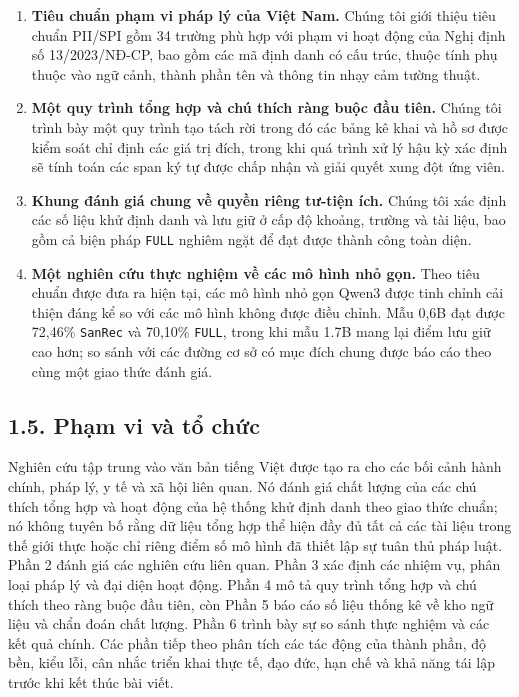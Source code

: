 \documentclass[
  11pt,
  a4paper,
]{article}
\providecommand{\tightlist}{%
  \setlength{\itemsep}{0pt}\setlength{\parskip}{0pt}}
\begin{document}
\begin{enumerate}
\def\labelenumi{\arabic{enumi}.}
\tightlist
\item
  \textbf{Tiêu chuẩn phạm vi pháp lý của Việt Nam.} Chúng tôi giới thiệu
  tiêu chuẩn PII/SPI gồm 34 trường phù hợp với phạm vi hoạt động của
  Nghị định số 13/2023/NĐ-CP, bao gồm các mã định danh có cấu trúc,
  thuộc tính phụ thuộc vào ngữ cảnh, thành phần tên và thông tin nhạy
  cảm tường thuật.
\item
  \textbf{Một quy trình tổng hợp và chú thích ràng buộc đầu tiên.} Chúng
  tôi trình bày một quy trình tạo tách rời trong đó các bảng kê khai và
  hồ sơ được kiểm soát chỉ định các giá trị đích, trong khi quá trình xử
  lý hậu kỳ xác định sẽ tính toán các span ký tự được chấp nhận và giải
  quyết xung đột ứng viên.
\item
  \textbf{Khung đánh giá chung về quyền riêng tư-tiện ích.} Chúng tôi
  xác định các số liệu khử định danh và lưu giữ ở cấp độ khoảng, trường
  và tài liệu, bao gồm cả biện pháp \texttt{FULL} nghiêm ngặt để đạt
  được thành công toàn diện.
\item
  \textbf{Một nghiên cứu thực nghiệm về các mô hình nhỏ gọn.} Theo tiêu
  chuẩn được đưa ra hiện tại, các mô hình nhỏ gọn Qwen3 được tinh chỉnh
  cải thiện đáng kể so với các mô hình không được điều chỉnh. Mẫu 0,6B
  đạt được 72,46\% \texttt{SanRec} và 70,10\% \texttt{FULL}, trong khi
  mẫu 1.7B mang lại điểm lưu giữ cao hơn; so sánh với các đường cơ sở có
  mục đích chung được báo cáo theo cùng một giao thức đánh giá.
\end{enumerate}

\subsection{1.5. Phạm vi và tổ
chức}\label{phux1ea1m-vi-vuxe0-tux1ed5-chux1ee9c}

Nghiên cứu tập trung vào văn bản tiếng Việt được tạo ra cho các bối cảnh
hành chính, pháp lý, y tế và xã hội liên quan. Nó đánh giá chất lượng
của các chú thích tổng hợp và hoạt động của hệ thống khử định danh theo
giao thức chuẩn; nó không tuyên bố rằng dữ liệu tổng hợp thể hiện đầy đủ
tất cả các tài liệu trong thế giới thực hoặc chỉ riêng điểm số mô hình
đã thiết lập sự tuân thủ pháp luật. Phần 2 đánh giá các nghiên cứu liên
quan. Phần 3 xác định các nhiệm vụ, phân loại pháp lý và đại diện hoạt
động. Phần 4 mô tả quy trình tổng hợp và chú thích theo ràng buộc đầu
tiên, còn Phần 5 báo cáo số liệu thống kê về kho ngữ liệu và chẩn đoán
chất lượng. Phần 6 trình bày sự so sánh thực nghiệm và các kết quả
chính. Các phần tiếp theo phân tích các tác động của thành phần, độ bền,
kiểu lỗi, cân nhắc triển khai thực tế, đạo đức, hạn chế và khả năng tái
lập trước khi kết thúc bài viết.
\end{document}
